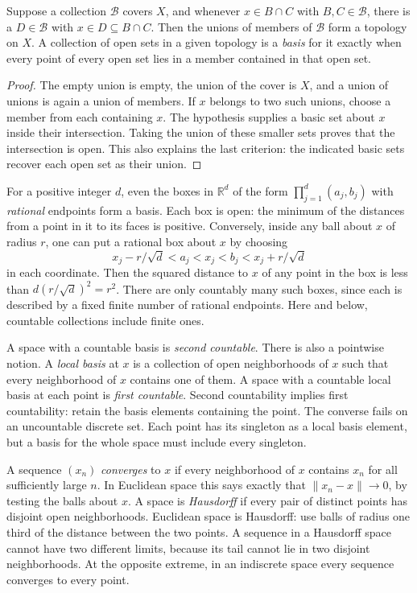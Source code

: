 \begin{proposition}\label{f:top-basis}
Suppose a collection $\mathcal B$ covers $X$, and whenever $x\in B\cap C$ with $B,C\in\mathcal B$, there is a $D\in\mathcal B$ with $x\in D\subseteq B\cap C$. Then the unions of members of $\mathcal B$ form a topology on $X$. A collection of open sets in a given topology is a \emph{basis} for it exactly when every point of every open set lies in a member contained in that open set.
\end{proposition}
\begin{proof}
The empty union is empty, the union of the cover is $X$, and a union of unions is again a union of members. If $x$ belongs to two such unions, choose a member from each containing $x$. The hypothesis supplies a basic set about $x$ inside their intersection. Taking the union of these smaller sets proves that the intersection is open. This also explains the last criterion: the indicated basic sets recover each open set as their union.
\end{proof}

For a positive integer $d$, even the boxes in $\mathbb R^d$ of the form $\prod_{j=1}^d(a_j,b_j)$ with \emph{rational} endpoints form a basis. Each box is open: the minimum of the distances from a point in it to its faces is positive. Conversely, inside any ball about $x$ of radius $r$, one can put a rational box about $x$ by choosing
\[
 x_j-r/\sqrt d<a_j<x_j<b_j<x_j+r/\sqrt d
\]
in each coordinate. Then the squared distance to $x$ of any point in the box is less than $d(r/\sqrt d)^2=r^2$. There are only countably many such boxes, since each is described by a fixed finite number of rational endpoints. Here and below, countable collections include finite ones.

A space with a countable basis is \emph{second countable}. There is also a pointwise notion. A \emph{local basis} at $x$ is a collection of open neighborhoods of $x$ such that every neighborhood of $x$ contains one of them. A space with a countable local basis at each point is \emph{first countable}. Second countability implies first countability: retain the basis elements containing the point. The converse fails on an uncountable discrete set. Each point has its singleton as a local basis element, but a basis for the whole space must include every singleton.

A sequence $(x_n)$ \emph{converges} to $x$ if every neighborhood of $x$ contains $x_n$ for all sufficiently large $n$. In Euclidean space this says exactly that $\|x_n-x\|\to0$, by testing the balls about $x$. A space is \emph{Hausdorff} if every pair of distinct points has disjoint open neighborhoods. Euclidean space is Hausdorff: use balls of radius one third of the distance between the two points. A sequence in a Hausdorff space cannot have two different limits, because its tail cannot lie in two disjoint neighborhoods. At the opposite extreme, in an indiscrete space every sequence converges to every point.

